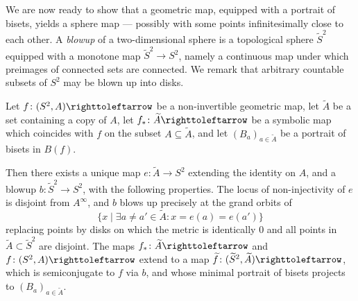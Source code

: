 \documentclass{amsart}
\newcommand\wtf{{\widetilde f}}
\newcommand\wtA{{\widetilde A}}
\begin{document}
We are now ready to show that a geometric map, equipped with a
portrait of bisets, yields a sphere map --- possibly with some points
infinitesimally close to each other. A \emph{blowup} of a
two-dimensional sphere is a topological sphere $\widetilde S^2$
equipped with a monotone map $\widetilde S^2\to S^2$, namely a
continuous map under which preimages of connected sets are
connected. We remark that arbitrary countable subsets of $S^2$ may be
blown up into disks.
\begin{prop}\label{prop:Shadow}
  Let $f\colon (S^2,A)\selfmap$ be a non-invertible geometric map, let
  $\wtA$ be a set containing a copy of $A$, let
  $f_*\colon\wtA\selfmap$ be a symbolic map which coincides
  with $f$ on the subset $A\subseteq\wtA$, and let
  $(B_a)_{a\in\wtA}$ be a portrait of bisets in $B(f)$.

  Then there exists a unique map $e\colon\wtA\to S^2$
  extending the identity on $A$, and a blowup
  $b\colon \widetilde S^2\to S^2$, with the following properties. The
  locus of non-injectivity of $e$ is disjoint from $A^\infty$, and $b$
  blows up precisely at the grand orbits of
  \[\{x\mid \exists a\neq a'\in \wtA\colon x=e(a)=e(a')\}\]
  replacing points by disks on which the metric is identically $0$ and
  all points in $\wtA\subset\widetilde S^2$ are disjoint. The
  maps $f_*\colon\wtA\selfmap$ and $f\colon(S^2,A)\selfmap$
  extend to a map $\wtf\colon(\widetilde S^2,\wtA)\selfmap$,
  which is semiconjugate to $f$ via $b$, and whose minimal portrait of
  bisets projects to $(B_a)_{a\in\wtA}$.
\end{prop}
\end{document}
